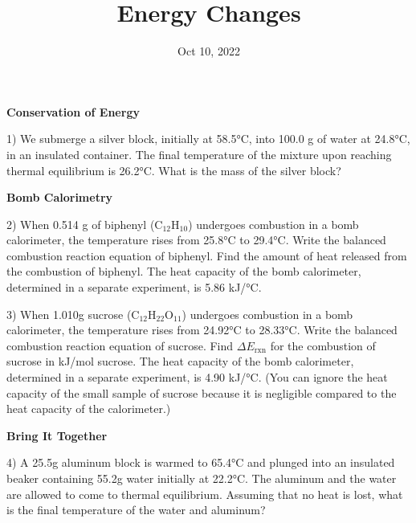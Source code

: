 \documentclass[12pt]{article}
\title{\textbf{Energy Changes}}
\date{Oct 10, 2022}
\begin{document}
\maketitle 

\textbf{Conservation of Energy}

1) We submerge a silver block, initially at 58.5°C, into 100.0 g of
water at 24.8°C, in an insulated container. The final temperature
of the mixture upon reaching thermal equilibrium is 26.2°C. What is
the mass of the silver block?

\textbf{Bomb Calorimetry}

2) When 0.514 g of biphenyl (C$_{12}$H$_{10}$) undergoes combustion in a
bomb calorimeter, the temperature rises from 25.8°C to 29.4°C.
Write the balanced combustion reaction equation of biphenyl.
Find the amount of heat released from the combustion of biphenyl.
The heat capacity of the bomb calorimeter, determined in a separate
experiment, is 5.86 kJ/°C.

3) When 1.010g sucrose (C$_{12}$H$_{22}$O$_{11}$) undergoes combustion in a bomb
calorimeter, the temperature rises from 24.92°C to 28.33°C. Write the balanced
combustion reaction equation of sucrose. Find $\Delta E_\text{rxn}$ for the combustion
of sucrose in kJ/mol sucrose. The heat capacity of the bomb calorimeter, determined
in a separate experiment, is 4.90 kJ/°C. (You can ignore the heat capacity of the
small sample of sucrose because it is negligible compared to the heat capacity of
the calorimeter.)

\textbf{Bring It Together}

4) A 25.5g aluminum block is warmed to 65.4°C and plunged into an insulated beaker
containing 55.2g water initially at 22.2°C. The aluminum and the water are allowed
to come to thermal equilibrium. Assuming that no heat is lost, what is the final
temperature of the water and aluminum?
\end{document}

